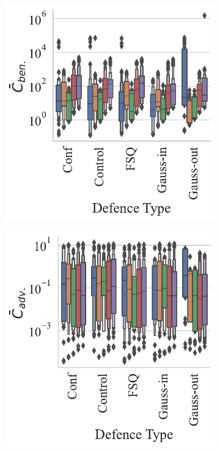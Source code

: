 \begin{figure}[h!]
    \centering
    \begin{subfigure}[]{.3\textwidth}
        \centering
        \includegraphics[width=\textwidth]{mnist/ben_failures_per_train_time_vs_defence_type.pdf}
    \end{subfigure}
    \begin{subfigure}[]{0.3\textwidth}
        \includegraphics[width=\textwidth]{mnist/adv_failures_per_train_time_vs_defence_type.pdf}

\end{subfigure}
\end{figure}
